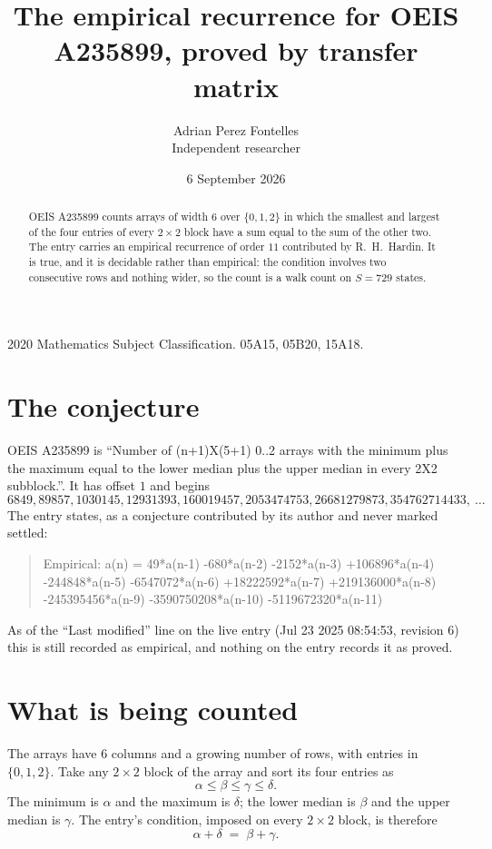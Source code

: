 \documentclass[11pt,a4paper]{article}
\title{The empirical recurrence for OEIS A235899, proved by transfer matrix}
\author{Adrian Perez Fontelles\\ \small Independent researcher}
\date{6 September 2026}
\theoremstyle{plain}
\theoremstyle{definition}
\begin{document}
\maketitle

\begin{abstract}
OEIS A235899 counts arrays of width $6$ over $\{0,1,2\}$ in which the smallest and largest of the
four entries of every $2\times2$ block have a sum equal to the sum of the other two. The entry
carries an empirical recurrence of order $11$ contributed by R.~H.~Hardin. It is true, and
it is decidable rather than empirical: the condition involves two consecutive rows and nothing
wider, so the count is a walk count on $S=729$ states.
\end{abstract}

\noindent\small 2020 Mathematics Subject Classification. 05A15, 05B20, 15A18.\normalsize

\section{The conjecture}

OEIS A235899 is ``Number of (n+1)X(5+1) 0..2 arrays with the minimum plus the maximum equal to the lower median plus the upper median in every 2X2 subblock.''. It has offset $1$ and begins
\[
6849, 89857, 1030145, 12931393, 160019457, 2053474753, 26681279873, 354762714433,\ \dots
\]
The entry states, as a conjecture contributed by its author and never marked settled:
\begin{quote}
Empirical: a(n) = 49*a(n-1) -680*a(n-2) -2152*a(n-3) +106896*a(n-4) -244848*a(n-5) -6547072*a(n-6) +18222592*a(n-7) +219136000*a(n-8) -245395456*a(n-9) -3590750208*a(n-10) -5119672320*a(n-11)
\end{quote}
As of the ``Last modified'' line on the live entry (Jul 23 2025 08:54:53, revision 6) this is still
recorded as empirical, and nothing on the entry records it as proved.

\section{What is being counted}

The arrays have $6$ columns and a growing number of rows, with entries in $\{0,1,2\}$. Take any
$2\times2$ block of the array and sort its four entries as
\[
\alpha\le\beta\le\gamma\le\delta .
\]
The minimum is $\alpha$ and the maximum is $\delta$; the lower median is $\beta$ and the upper
median is $\gamma$. The entry's condition, imposed on every $2\times2$ block, is therefore
\[
\alpha+\delta\;=\;\beta+\gamma .
\]
\end{document}
